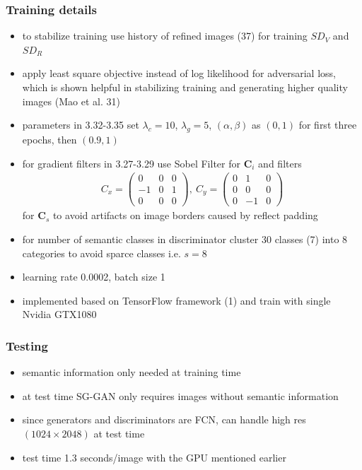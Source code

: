 \documentclass[]{article}
\begin{document}
\subsubsection{Training details}
\begin{itemize}
	\item to stabilize training use history of refined images (37) for training $SD_V$ and $SD_R$
	\item apply least square objective instead of log likelihood for adversarial loss, which is shown helpful in stabilizing training and generating higher quality images (Mao et al. 31)
	\item parameters in 3.32-3.35 set $\lambda_c = 10$, $\lambda_g = 5$, $(\alpha, \beta)$ as $(0,1)$ for first three epochs, then $(0.9, 1)$
	\item for gradient filters in 3.27-3.29 use Sobel Filter for $\mathbf{C}_i$ and filters 
	\begin{align}
		C_x = 
		\begin{pmatrix}
		0 & 0 & 0 \\
		-1 & 0 & 1\\
		0 & 0 & 0
		\end{pmatrix}
		,~
		C_y =
		\begin{pmatrix}
		0 & 1 & 0 \\
		0 & 0 & 0 \\
		0 & -1 & 0
		\end{pmatrix}
	\end{align}
	for $\mathbf{C}_s$ to avoid artifacts on image borders caused by reflect padding
	\item for number of semantic classes in discriminator cluster 30 classes (7) into 8 categories to avoid sparce classes i.e. $s = 8$
	\item learning rate 0.0002, batch size 1
	\item implemented based on TensorFlow framework (1) and train with single Nvidia GTX1080
\end{itemize}

\subsubsection{Testing}
\begin{itemize}
	\item semantic information only needed at training time
	\item at test time SG-GAN only requires images without semantic information
	\item since generators and discriminators are FCN, can handle high res $(1024 \times 2048)$ at test time
	\item test time 1.3 seconds/image with the GPU mentioned earlier
\end{itemize}
\end{document}
